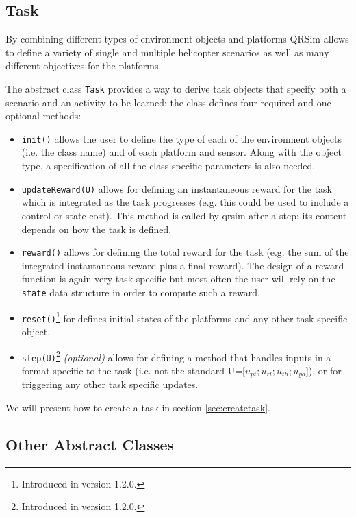 \documentclass[a4paper,11pt]{report}
\newcommand{\sname}{QRSim\xspace}
\begin{document}
\subsection{Task} \label{sec:task}

By combining different types of environment objects and platforms \sname allows to define a variety of single and multiple helicopter scenarios as well as many different objectives for the platforms.

The abstract class \texttt{Task} provides a way to derive task objects that specify both a scenario and an activity to be learned; the class defines four required and one optional methods:

\begin{itemize}
 \item \texttt{init()} allows the user to define the type of each of the environment objects (i.e. the class name) and of each platform and sensor. Along with the object type, a specification of all the class specific parameters is also needed.
 \item \texttt{updateReward(U)} allows for defining an instantaneous reward for the task which is integrated as the task progresses (e.g. this could be used to include a control or state cost). This method is called by qrsim after a step; its content depends on how the task is defined.
 \item \texttt{reward()} allows for defining the total reward for the task (e.g. the sum of the integrated instantaneous reward plus a final reward). The design of a reward function is again very task specific but most often the user will rely on the \texttt{state} data structure in order to compute such a reward. 
 \item \texttt{reset()}\footnote{Introduced in version 1.2.0.} for defines initial states of the platforms and any other task specific object.
 \item \texttt{step(U)}\footnote{Introduced in version 1.2.0.} \textit{(optional)} allows for defining a method that handles inputs in a format specific to the task (i.e. not the standard U=[$u_{pt};u_{rl};u_{th};u_{ya}$]), or for triggering any other task specific updates. 
\end{itemize}

We will present how to create a task in section \ref{sec:createtask}.

\subsection{Other Abstract Classes}
\end{document}
